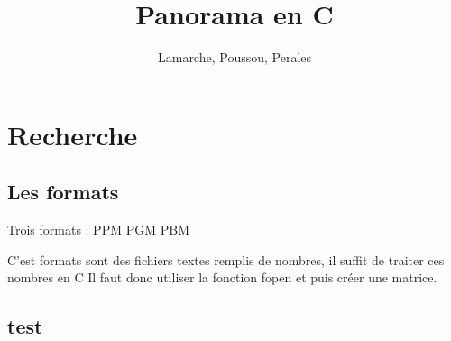 \documentclass[a4paper,10pt]{report}
\title{Panorama en C}
\author{Lamarche, Poussou, Perales}
\begin{document}
\maketitle
\tableofcontents
\chapter{Recherche}
\section{Les formats}

Trois formats : PPM PGM PBM



C'est formats sont des fichiers textes remplis de nombres, il suffit de traiter ces nombres en C
Il faut donc utiliser la fonction fopen et puis créer une matrice.
\section{test}
\end{document}
